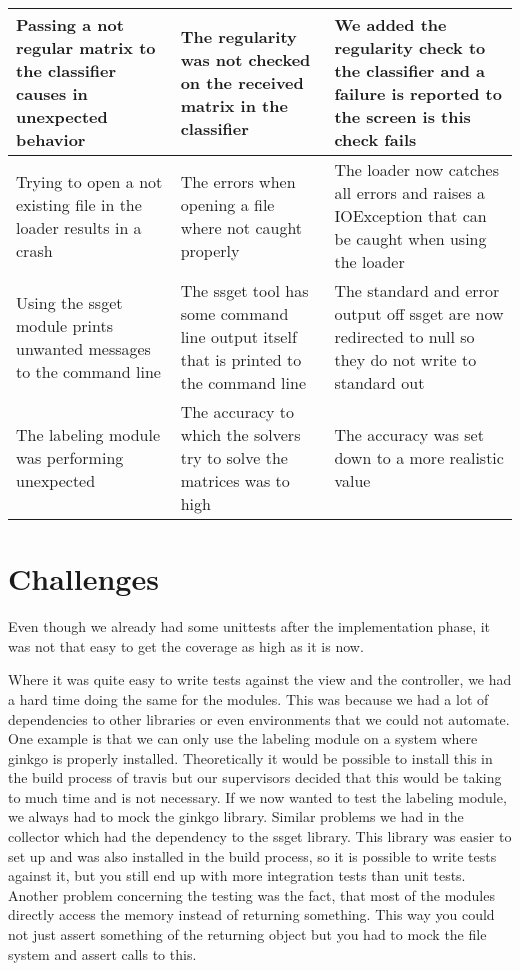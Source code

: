 \documentclass[parskip=full]{scrartcl}
\begin{document}
\begin{tabular}{|p{4.5cm}|p{4.5cm}|p{4.5cm}|}
\hline

Passing a not regular matrix to the classifier causes in unexpected behavior &
The regularity was not checked on the received matrix in the classifier &
We added the regularity check to the classifier and a failure is reported to the screen is this check fails \\

\hline

Trying to open a not existing file in the loader results in a crash &
The errors when opening a file where not caught properly &
The loader now catches all errors and raises a IOException that can be caught when using the loader \\

\hline

Using the \gls{ssget} module prints unwanted messages to the command line &
The \gls{ssget} tool has some command line output itself that is printed to the command line &
The standard and error output off \gls{ssget} are now redirected to null so they do not write to standard out \\

\hline

The labeling module was performing unexpected &
The accuracy to which the solvers try to solve the matrices was to high &
The accuracy was set down to a more realistic value \\

\hline

\end{tabular}

\newpage

\section{Challenges}

Even though we already had some \glspl{unittest} after the implementation phase, it was not that easy to get the coverage as high as it is now.


Where it was quite easy to write tests against the view and the controller, we had a hard time doing the same for the modules.
This was because we had a lot of dependencies to other libraries or even environments that we could not automate.
One example is that we can only use the labeling module on a system where \gls{ginkgo} is properly installed.
Theoretically it would be possible to install this in the build process of \gls{travis} but our supervisors decided that this would be taking to much time and is not necessary.
If we now wanted to test the labeling module, we always had to mock the \gls{ginkgo} library.
Similar problems we had in the collector which had the dependency to the \gls{ssget} library.
This library was easier to set up and was also installed in the build process, so it is possible to write tests against it, but you still end up with more integration tests than unit tests.
Another problem concerning the testing was the fact, that most of the modules directly access the memory instead of returning something.
This way you could not just assert something of the returning object but you had to mock the file system and assert calls to this.
\end{document}
